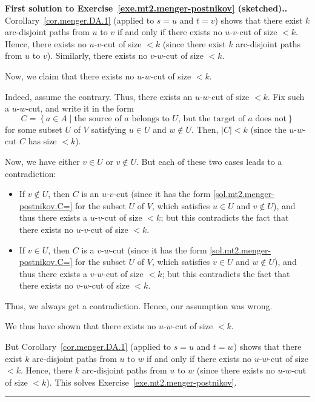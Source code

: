 \documentclass[numbers=enddot,12pt,final,onecolumn,notitlepage]{scrartcl}%
\theoremstyle{definition}
\newenvironment{proof}[1][Proof]{\noindent\textbf{#1.} }{\ \rule{0.5em}{0.5em}}
\newcommand{\set}[1]{\left\{ #1 \right\}}
\newcommand{\abs}[1]{\left| #1 \right|}
\begin{document}
\begin{proof}[First solution to
Exercise~\ref{exe.mt2.menger-postnikov} (sketched).]
Corollary~\ref{cor.menger.DA.1} (applied to $s = u$ and $t = v$) shows
that there exist $k$ arc-disjoint paths from $u$ to $v$ if and only
if there exists no $u$-$v$-cut of size $< k$.
Hence, there exists no $u$-$v$-cut of size $< k$
(since there exist $k$ arc-disjoint paths from $u$ to $v$).
Similarly, there exists no $v$-$w$-cut of size $< k$.

Now, we claim that there exists no $u$-$w$-cut of size $< k$.

Indeed, assume the contrary.
Thus, there exists an $u$-$w$-cut of size $< k$.
Fix such a $u$-$w$-cut, and write it in the form
\begin{equation}
C = \set{ a \in A \mid \text{the source of } a \text{ belongs to } U
                        \text{, but the target of } a \text{ does not}
        }
\label{sol.mt2.menger-postnikov.C=}
\end{equation}
for some subset $U$ of $V$ satisfying $u \in U$ and $w \notin U$.
Then, $\abs{C} < k$ (since the $u$-$w$-cut $C$ has size $< k$).

Now, we have either $v \in U$ or $v \notin U$.
But each of these two cases leads to a contradiction:

\begin{itemize}

\item If $v \notin U$, then $C$ is an $u$-$v$-cut (since it has the
      form \eqref{sol.mt2.menger-postnikov.C=} for the subset $U$
      of $V$, which satisfies $u \in U$ and $v \notin U$), and thus
      there exists a $u$-$v$-cut of size $< k$; but this
      contradicts the fact that there exists no $u$-$v$-cut of size
      $< k$.

\item If $v \in U$, then $C$ is a $v$-$w$-cut (since it has the
      form \eqref{sol.mt2.menger-postnikov.C=} for the subset $U$
      of $V$, which satisfies $v \in U$ and $w \notin U$), and thus
      there exists a $v$-$w$-cut of size $< k$; but this
      contradicts the fact that there exists no $v$-$w$-cut of size
      $< k$.

\end{itemize}

Thus, we always get a contradiction.
Hence, our assumption was wrong.

We thus have shown that there exists no $u$-$w$-cut of size $< k$.

But Corollary~\ref{cor.menger.DA.1} (applied to $s = u$ and $t = w$)
shows that there exist $k$ arc-disjoint paths from $u$ to $w$ if and
only if there exists no $u$-$w$-cut of size $< k$.
Hence, there $k$ arc-disjoint paths from $u$ to $w$ (since
there exists no $u$-$w$-cut of size $< k$).
This solves Exercise~\ref{exe.mt2.menger-postnikov}.
\end{proof}
\end{document}
